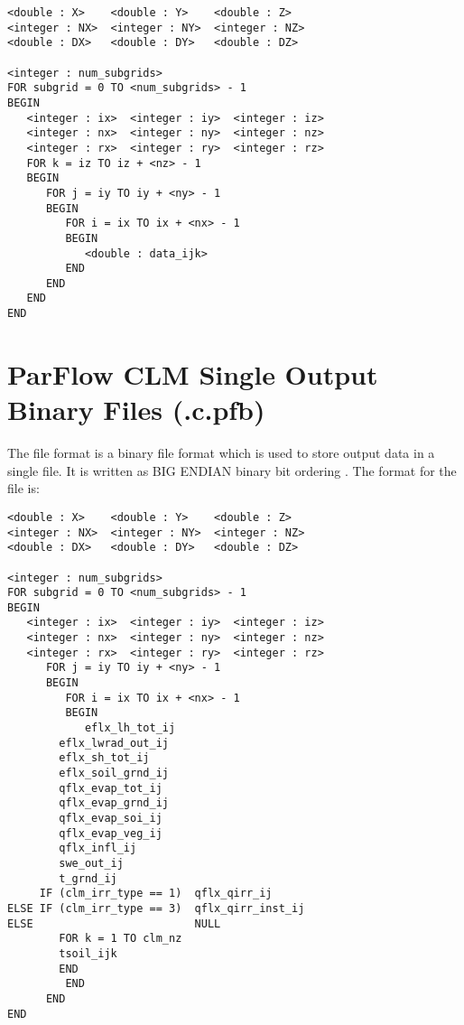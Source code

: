 \begin{display}\begin{verbatim}
<double : X>    <double : Y>    <double : Z>
<integer : NX>  <integer : NY>  <integer : NZ>
<double : DX>   <double : DY>   <double : DZ>

<integer : num_subgrids>
FOR subgrid = 0 TO <num_subgrids> - 1
BEGIN
   <integer : ix>  <integer : iy>  <integer : iz>
   <integer : nx>  <integer : ny>  <integer : nz>
   <integer : rx>  <integer : ry>  <integer : rz>
   FOR k = iz TO iz + <nz> - 1
   BEGIN
      FOR j = iy TO iy + <ny> - 1
      BEGIN
         FOR i = ix TO ix + <nx> - 1
         BEGIN
            <double : data_ijk>
         END
      END
   END
END
\end{verbatim}\end{display}

\section{ParFlow CLM Single Output Binary Files (.c.pfb)}
\label{ParFlow Binary Files (.c.pfb)}

The  file format is a binary file format which is used
to store  output data in a single file.  It is written as BIG ENDIAN binary bit ordering \cite{endian}.
The format for the file is:

\begin{display}\begin{verbatim}
<double : X>    <double : Y>    <double : Z>
<integer : NX>  <integer : NY>  <integer : NZ>
<double : DX>   <double : DY>   <double : DZ>

<integer : num_subgrids>
FOR subgrid = 0 TO <num_subgrids> - 1
BEGIN
   <integer : ix>  <integer : iy>  <integer : iz>
   <integer : nx>  <integer : ny>  <integer : nz>
   <integer : rx>  <integer : ry>  <integer : rz>
      FOR j = iy TO iy + <ny> - 1
      BEGIN
         FOR i = ix TO ix + <nx> - 1
         BEGIN
            eflx_lh_tot_ij
	    eflx_lwrad_out_ij
	    eflx_sh_tot_ij
	    eflx_soil_grnd_ij
	    qflx_evap_tot_ij
	    qflx_evap_grnd_ij
	    qflx_evap_soi_ij
	    qflx_evap_veg_ij
	    qflx_infl_ij
	    swe_out_ij
	    t_grnd_ij
     IF (clm_irr_type == 1)  qflx_qirr_ij 
ELSE IF (clm_irr_type == 3)  qflx_qirr_inst_ij
ELSE                         NULL
	    FOR k = 1 TO clm_nz
	    tsoil_ijk
	    END
         END
      END
END
\end{verbatim}\end{display}

